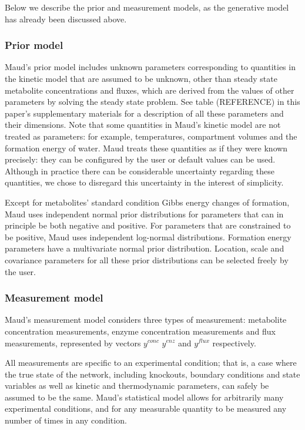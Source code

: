\documentclass[journal=,manuscript=]{achemso}
\begin{document}
Below we describe the prior and measurement models, as the generative
model has already been discussed above.

\hypertarget{prior-model}{%
\subsubsection{Prior model}\label{prior-model}}

Maud's prior model includes unknown parameters corresponding to
quantities in the kinetic model that are assumed to be unknown, other
than steady state metabolite concentrations and fluxes, which are
derived from the values of other parameters by solving the steady state
problem. See table (REFERENCE) in this paper's supplementary materials
for a description of all these parameters and their dimensions. Note
that some quantities in Maud's kinetic model are not treated as
parameters: for example, temperatures, compartment volumes and the
formation energy of water. Maud treats these quantities as if they were
known precisely: they can be configured by the user or default values
can be used. Although in practice there can be considerable uncertainty
regarding these quantities, we chose to disregard this uncertainty in
the interest of simplicity.

Except for metabolites' standard condition Gibbs energy changes of
formation, Maud uses independent normal prior distributions for
parameters that can in principle be both negative and positive. For
parameters that are constrained to be positive, Maud uses independent
log-normal distributions. Formation energy parameters have a
multivariate normal prior distribution. Location, scale and covariance
parameters for all these prior distributions can be selected freely by
the user.

\hypertarget{measurement-model}{%
\subsubsection{Measurement model}\label{measurement-model}}

Maud's measurement model considers three types of measurement:
metabolite concentration measurements, enzyme concentration measurements
and flux measurements, represented by vectors \(𝑦^{𝑐𝑜𝑛𝑐}\) \(𝑦^{𝑒𝑛𝑧}\)
and \(𝑦^{𝑓𝑙𝑢𝑥}\) respectively.

All measurements are specific to an experimental condition; that is, a
case where the true state of the network, including knockouts, boundary
conditions and state variables as well as kinetic and thermodynamic
parameters, can safely be assumed to be the same. Maud's statistical
model allows for arbitrarily many experimental conditions, and for any
measurable quantity to be measured any number of times in any condition.
\end{document}
